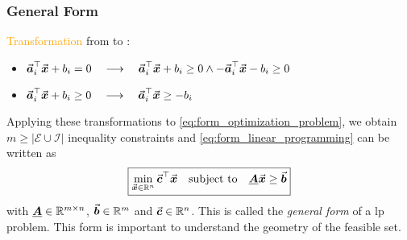 \subsubsection{General Form}\label{sec:generalform_linear_programming}
\textcolor{orange}{Transformation}  from  to :
\begin{itemize}
  \item \(\vec{\boldsymbol{a}}_i^\top \vec{\boldsymbol{x}} + b_i = 0    \quad \longrightarrow \quad \vec{\boldsymbol{a}}_i^\top \vec{\boldsymbol{x}} + b_i \geq 0 \land -\vec{\boldsymbol{a}}_i^\top \vec{\boldsymbol{x}} - b_i \geq 0\)
  \item \(\vec{\boldsymbol{a}}_i^\top \vec{\boldsymbol{x}} + b_i \geq 0 \quad \longrightarrow \quad \vec{\boldsymbol{a}}_i^\top \vec{\boldsymbol{x}} \geq -b_i\)
\end{itemize}
Applying these transformations to \eqref{eq:form_optimization_problem}, we obtain \(m \geq |\mathcal{E} \cup \mathcal{I}|\) inequality constraints and \eqref{eq:form_linear_programming} can be written as
\begin{equation}\label{eq:form_general_linear_programming}
\boxed{ 
    \min_{\vec{\boldsymbol{x}} \in \mathbb{R}^{n}} \vec{\boldsymbol{c}}^\top \vec{\boldsymbol{x}} \quad \text{subject to} \quad
    \underline{\boldsymbol{A}} \vec{\boldsymbol{x}} \geq \vec{\boldsymbol{b}}
    }
\end{equation}
with \(\underline{\boldsymbol{A}} \in \mathbb{R}^{m\times n}\), \(\vec{\boldsymbol{b}} \in \mathbb{R}^{m}\) and \(\vec{\boldsymbol{c}} \in \mathbb{R}^{n}\).
This is called the \emph{general form} of a \gls{lp} problem.
This form is important to understand the geometry of the feasible set.




\def\xint{5}
\def\yint{4}
\def\zint{0.8}

\def\qx{1.4} \def\qy{3}

\def\labx{3} \def\laby{2.5}

\def\pax{4} \def\pay{6}
\def\pbx{6} \def\pby{-1}
\def\pcx{-1} \def\pcy{-1}
\def\pdx{-1} \def\pdy{6}

